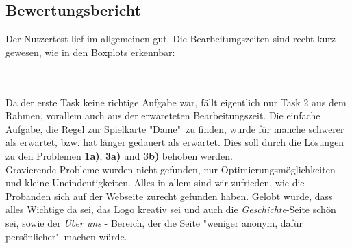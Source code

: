 \documentclass{scrartcl}
\begin{document}
\subsection*{Bewertungsbericht}
Der Nutzertest lief im allgemeinen gut. Die Bearbeitungszeiten sind recht kurz gewesen, wie in den Boxplots erkennbar: \\ \\
\\
Da der erste Task keine richtige Aufgabe war, fällt eigentlich nur Task 2 aus dem Rahmen, vorallem auch aus der erwareteten Bearbeitungszeit. Die einfache Aufgabe, die Regel zur Spielkarte "Dame"\ zu finden, wurde für manche schwerer als erwartet, bzw. hat länger gedauert als erwartet. Dies soll durch die Lösungen zu den Problemen \textbf{1a)}, \textbf{3a)} und \textbf{3b)} behoben werden. \\
Gravierende Probleme wurden nicht gefunden, nur Optimierungsmöglichkeiten und kleine Uneindeutigkeiten. Alles in allem sind wir zufrieden, wie die Probanden sich auf der Webseite zurecht gefunden haben. Gelobt wurde, dass alles Wichtige da sei, das Logo kreativ sei und auch die \textit{Geschichte}-Seite schön sei, sowie der \textit{Über uns} - Bereich, der die Seite "weniger anonym, dafür persönlicher"\ machen würde.
\end{document}
